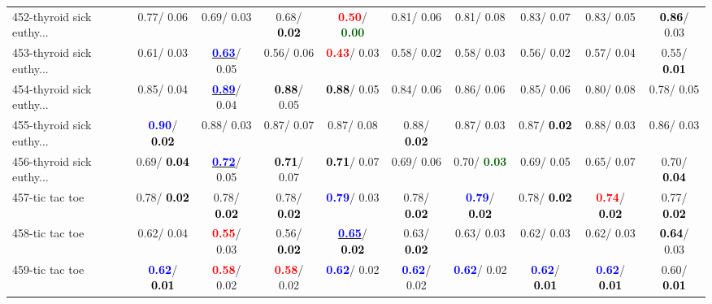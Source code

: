 \begin{table}[h]
\begin{center}
{\begin{tabular}{lc|c|c|c|c|c|c|c|c}
452-thyroid sick euthy... &   0.77/  0.06 &   0.69/  0.03 &   0.68/\textcolor{black}{\textbf{  0.02}} & \textcolor{red}{\textbf{  0.50}}/\textcolor{darkgreen}{\textbf{  0.00}} &   0.81/  0.06 &   0.81/  0.08 &   0.83/  0.07 &   0.83/  0.05 & \textcolor{black}{\textbf{  0.86}}/  0.03 \\
453-thyroid sick euthy... &   0.61/  0.03 & \underline{\textcolor{blue}{\textbf{  0.63}}}/  0.05 &   0.56/  0.06 & \textcolor{red}{\textbf{  0.43}}/  0.03 &   0.58/  0.02 &   0.58/  0.03 &   0.56/  0.02 &   0.57/  0.04 &   0.55/\textcolor{black}{\textbf{  0.01}} \\
454-thyroid sick euthy... &   0.85/  0.04 & \underline{\textcolor{blue}{\textbf{  0.89}}}/  0.04 & \textcolor{black}{\textbf{  0.88}}/  0.05 & \textcolor{black}{\textbf{  0.88}}/  0.05 &   0.84/  0.06 &   0.86/  0.06 &   0.85/  0.06 &   0.80/  0.08 &   0.78/  0.05 \\
455-thyroid sick euthy... & \textcolor{blue}{\textbf{  0.90}}/\textcolor{black}{\textbf{  0.02}} &   0.88/  0.03 &   0.87/  0.07 &   0.87/  0.08 &   0.88/\textcolor{black}{\textbf{  0.02}} &   0.87/  0.03 &   0.87/\textcolor{black}{\textbf{  0.02}} &   0.88/  0.03 &   0.86/  0.03 \\ \hline
456-thyroid sick euthy... &   0.69/\textcolor{black}{\textbf{  0.04}} & \underline{\textcolor{blue}{\textbf{  0.72}}}/  0.05 & \textcolor{black}{\textbf{  0.71}}/  0.07 & \textcolor{black}{\textbf{  0.71}}/  0.07 &   0.69/  0.06 &   0.70/\textcolor{darkgreen}{\textbf{  0.03}} &   0.69/  0.05 &   0.65/  0.07 &   0.70/\textcolor{black}{\textbf{  0.04}} \\
457-tic tac toe &   0.78/\textcolor{black}{\textbf{  0.02}} &   0.78/\textcolor{black}{\textbf{  0.02}} &   0.78/\textcolor{black}{\textbf{  0.02}} & \textcolor{blue}{\textbf{  0.79}}/  0.03 &   0.78/\textcolor{black}{\textbf{  0.02}} & \textcolor{blue}{\textbf{  0.79}}/\textcolor{black}{\textbf{  0.02}} &   0.78/\textcolor{black}{\textbf{  0.02}} & \textcolor{red}{\textbf{  0.74}}/\textcolor{black}{\textbf{  0.02}} &   0.77/\textcolor{black}{\textbf{  0.02}} \\
458-tic tac toe &   0.62/  0.04 & \textcolor{red}{\textbf{  0.55}}/  0.03 &   0.56/\textcolor{black}{\textbf{  0.02}} & \underline{\textcolor{blue}{\textbf{  0.65}}}/\textcolor{black}{\textbf{  0.02}} &   0.63/\textcolor{black}{\textbf{  0.02}} &   0.63/  0.03 &   0.62/  0.03 &   0.62/  0.03 & \textcolor{black}{\textbf{  0.64}}/  0.03 \\
459-tic tac toe & \textcolor{blue}{\textbf{  0.62}}/\textcolor{black}{\textbf{  0.01}} & \textcolor{red}{\textbf{  0.58}}/  0.02 & \textcolor{red}{\textbf{  0.58}}/  0.02 & \textcolor{blue}{\textbf{  0.62}}/  0.02 & \textcolor{blue}{\textbf{  0.62}}/  0.02 & \textcolor{blue}{\textbf{  0.62}}/  0.02 & \textcolor{blue}{\textbf{  0.62}}/\textcolor{black}{\textbf{  0.01}} & \textcolor{blue}{\textbf{  0.62}}/\textcolor{black}{\textbf{  0.01}} &   0.60/\textcolor{black}{\textbf{  0.01}} \\

\end{tabular}}
\end{center}
\end{table}
